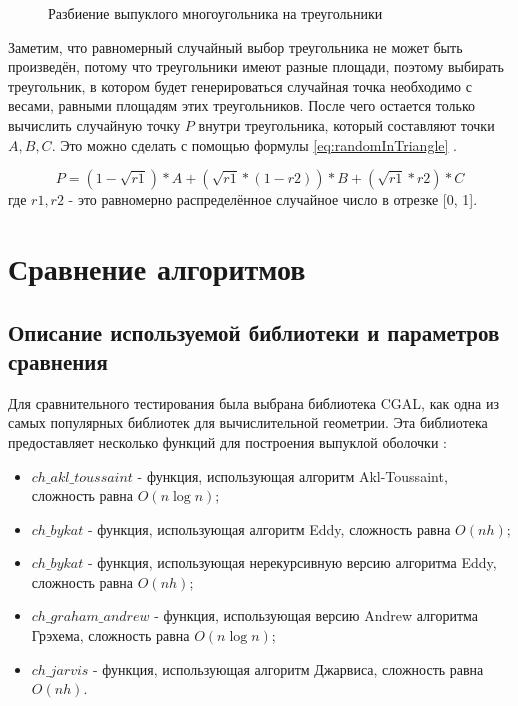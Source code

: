 \begin{figure}[H]
	\centering
	
	\caption{Разбиение выпуклого многоугольника на треугольники}
	\label{img:triangles}
\end{figure}

Заметим, что равномерный случайный выбор треугольника не может быть произведён, потому что треугольники имеют разные площади, поэтому выбирать треугольник, в котором будет генерироваться случайная точка необходимо с весами, равными площадям этих треугольников. После чего остается только вычислить случайную точку $P$ внутри треугольника, который составляют точки $A, B, C$. Это можно сделать с помощью формулы \eqref{eq:randomInTriangle} \cite{osada2002shape}.

\begin{equation}\label{eq:randomInTriangle}
P = (1 - \sqrt{r1}) * A + (\sqrt{r1} * (1 - r2)) * B + (\sqrt{r1} * r2) * C
\end{equation}
где $r1, r2$ - это равномерно распределённое случайное число в отрезке [0, 1].

\section{Сравнение алгоритмов}

\subsection{Описание используемой библиотеки и параметров сравнения}

Для сравнительного тестирования была выбрана библиотека CGAL, как одна из самых популярных библиотек для вычислительной геометрии. Эта библиотека предоставляет несколько функций для построения выпуклой оболочки \cite{cgalconvexhull}:
\begin{itemize}
	\item $ch\_akl\_toussaint$ - функция, использующая алгоритм Akl-Toussaint\cite{akl1978fast}, сложность равна $O(n \log n)$;
	\item $ch\_bykat$ - функция, использующая алгоритм Eddy\cite{eddy1977new}, сложность равна $O(nh)$;
	\item $ch\_bykat$ - функция, использующая нерекурсивную версию алгоритма Eddy\cite{bykat1978convex}, сложность равна $O(nh)$;
	\item $ch\_graham\_andrew$ - функция, использующая версию Andrew алгоритма Грэхема\cite{andrew1979another}, сложность равна $O(n \log n)$;
	\item $ch\_jarvis$ - функция, использующая алгоритм Джарвиса\cite{jarvis1973Jarvis}, сложность равна $O(nh)$.
\end{itemize}

